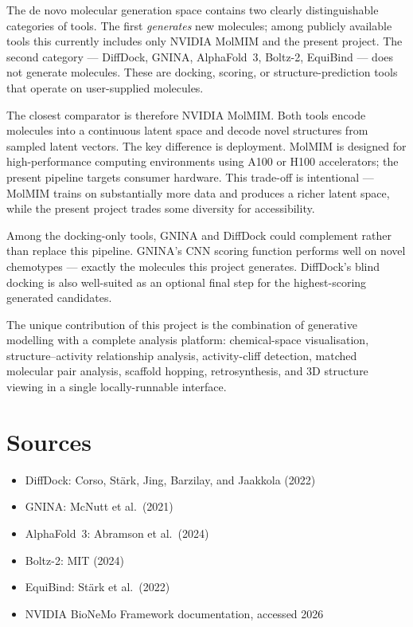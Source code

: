 \documentclass[11pt,a4paper]{article}
\begin{document}
The de novo molecular generation space contains two clearly distinguishable
categories of tools. The first \emph{generates} new molecules; among
publicly available tools this currently includes only NVIDIA MolMIM and
the present project. The second category --- DiffDock, GNINA,
AlphaFold~3, Boltz-2, EquiBind --- does not generate molecules. These
are docking, scoring, or structure-prediction tools that operate on
user-supplied molecules.

The closest comparator is therefore NVIDIA MolMIM. Both tools encode
molecules into a continuous latent space and decode novel structures
from sampled latent vectors. The key difference is deployment. MolMIM
is designed for high-performance computing environments using A100 or
H100 accelerators; the present pipeline targets consumer hardware.
This trade-off is intentional --- MolMIM trains on substantially more
data and produces a richer latent space, while the present project
trades some diversity for accessibility.

Among the docking-only tools, GNINA and DiffDock could complement rather
than replace this pipeline. GNINA's CNN scoring function performs well
on novel chemotypes --- exactly the molecules this project generates.
DiffDock's blind docking is also well-suited as an optional final step
for the highest-scoring generated candidates.

The unique contribution of this project is the combination of generative
modelling with a complete analysis platform: chemical-space visualisation,
structure--activity relationship analysis, activity-cliff detection,
matched molecular pair analysis, scaffold hopping, retrosynthesis, and
3D structure viewing in a single locally-runnable interface.

\section*{Sources}
\begin{itemize}
  \item DiffDock: Corso, St\"ark, Jing, Barzilay, and Jaakkola (2022)
  \item GNINA: McNutt et al.\ (2021)
  \item AlphaFold~3: Abramson et al.\ (2024)
  \item Boltz-2: MIT (2024)
  \item EquiBind: St\"ark et al.\ (2022)
  \item NVIDIA BioNeMo Framework documentation, accessed 2026
\end{itemize}
\end{document}
